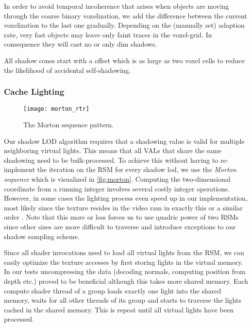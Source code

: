 \documentclass[thesis.tex]{subfiles}
\begin{document}
In order to avoid temporal incoherence that arises when objects are moving through the coarse binary voxelization, we add the difference between the current voxelization to the last one gradually. 
Depending on the (manually set) adaption rate, very fast objects may leave only faint traces in the voxel-grid.
In consequence they will cast no or only dim shadows.

All shadow cones start with a offset which is as large as two voxel cells to reduce the likelihood of accidental self-shadowing. 

\subsubsection{Cache Lighting}
\begin{figure}[h]
\centering
\texttt{[image: morton\_rtr]}
\caption{\cite[p.848]{bib:RealtimeRenderingBook} The Morton sequence pattern. } \label{fig:morton}
\end{figure}
Our shadow LOD algorithm requires that a shadowing value is valid for multiple neighboring virtual lights.
This means that all VALs that share the same shadowing need to be bulk-processed.
To achieve this without having to re-implement the iteration on the RSM for every shadow lod, we use the \emph{Morton sequence} \cite{bib:mortonorder} which is visualized in \autoref{fig:morton}.
Computing the two-dimensional coordinate from a running integer involves several costly integer operations.
However, in some cases the lighting process even speed up in our implementation, most likely since the texture resides in the video ram in exactly this or a similar order \cite[p.848]{bib:RealtimeRenderingBook}.
Note that this more or less forces us to use quadric power of two RSMs since other sizes are more difficult to traverse and introduce exceptions to our shadow sampling scheme.

Since all shader invocations need to load all virtual lights from the RSM, we can easily optimize the texture accesses by first storing lights in the virtual memory.
In our tests uncompressing the data (decoding normals, computing position from depth etc.) proved to be beneficial although this takes more shared memory.
Each compute shader thread of a group loads exactly one light into the shared memory, waits for all other threads of its group and starts to traverse the lights cached in the shared memory.
This is repeat until all virtual lights have been processed.

\subfilebib %
\end{document}
